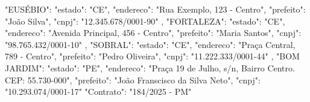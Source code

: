 {
    "EUSÉBIO": {
        "estado": "CE",
        "endereco": "Rua Exemplo, 123 - Centro",
        "prefeito": "João Silva",
        "cnpj": "12.345.678/0001-90"
    },
    "FORTALEZA": {
        "estado": "CE",
        "endereco": "Avenida Principal, 456 - Centro",
        "prefeito": "Maria Santos",
        "cnpj": "98.765.432/0001-10"
    },
    "SOBRAL": {
        "estado": "CE",
        "endereco": "Praça Central, 789 - Centro",
        "prefeito": "Pedro Oliveira",
        "cnpj": "11.222.333/0001-44"
    },
    "BOM JARDIM": {
        "estado": "PE",
        "endereco": "Praça 19 de Julho, s/n, Bairro Centro. CEP: 55.730-000",
        "prefeito": "João Franscisco da Silva Neto",
        "cnpj": "10.293.074/0001-17"
        "Contrato": "184/2025 - PM"
    }
}
